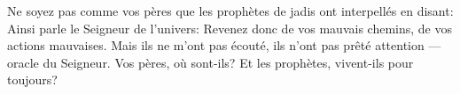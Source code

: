 Ne soyez pas comme vos pères que les prophètes de jadis ont interpellés en disant:
	Ainsi parle le Seigneur de l’univers:
	Revenez donc de vos mauvais chemins, de vos actions mauvaises.
Mais ils ne m’ont pas écouté, ils n’ont pas prêté attention --- oracle du Seigneur.
Vos pères, où sont-ils? Et les prophètes, vivent-ils pour toujours?
